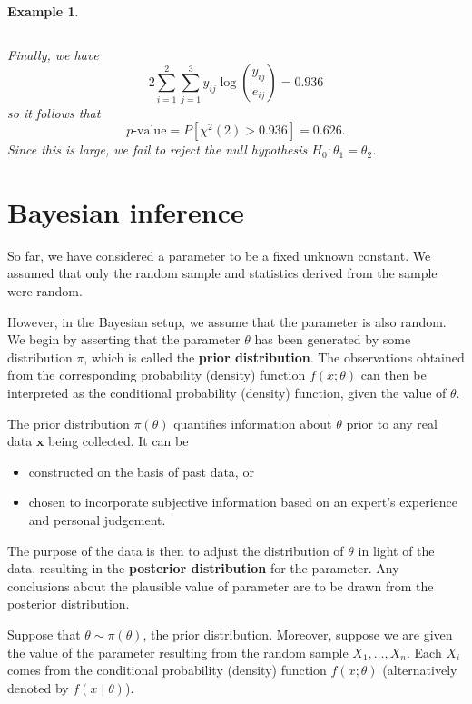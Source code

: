 \documentclass[10pt]{article}
\theoremstyle{newstyle}
\newtheorem{exmp}[thm]{Example}
\begin{document}
\begin{exmp}
\begin{table}[H]
\begin{tabular}{|c|c|c|c|}
\end{tabular}
\end{table}
Finally, we have 
\[ 2 \sum_{i=1}^2 \sum_{j=1}^3 y_{ij} \log 
\left( \frac{y_{ij}}{e_{ij}} \right) = 0.936 \]
so it follows that 
\[ \text{$p$-value} = P[\chi^2(2) > 0.936] = 0.626. \]
Since this is large, we fail to reject the null hypothesis $H_0 : \theta_1 = \theta_2$. 
\end{exmp}

\newpage 
\section{Bayesian inference}

So far, we have considered a parameter to be a fixed unknown constant. We assumed that 
only the random sample and statistics derived from the sample were random. 

However, in the Bayesian setup, we assume that the parameter is also random. We begin by 
asserting that the parameter $\theta$ has been generated by some distribution 
$\pi$, which is called the {\bf prior distribution}. The observations obtained 
from the corresponding probability (density) function $f(x; \theta)$ can then be interpreted 
as the conditional probability (density) function, given the value of $\theta$. 

The prior distribution $\pi(\theta)$ quantifies information about $\theta$ prior to any 
real data $\mathbf x$ being collected. It can be 
\begin{itemize}
    \item constructed on the basis of past data, or 
    \item chosen to incorporate subjective information based on an expert's experience and 
    personal judgement. 
\end{itemize}

The purpose of the data is then to adjust the distribution of $\theta$ in light of the data, resulting
in the {\bf posterior distribution} for the parameter. 
Any conclusions about the plausible value of parameter are to be drawn from the posterior distribution.

Suppose that $\theta \sim \pi(\theta)$, the prior distribution. Moreover, suppose we are 
given the value of the parameter resulting from the random sample $X_1, \dots, X_n$. 
Each $X_i$ comes from the conditional probability (density) function $f(x; \theta)$ 
(alternatively denoted by $f(x \mid \theta)$). 
\end{document}

